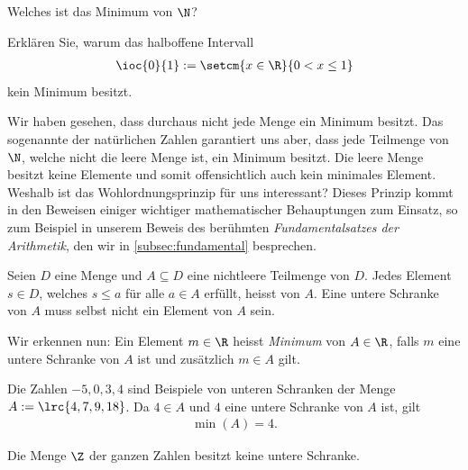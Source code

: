 \begin{myexercise}\label{myexercise:0267}
	\begin{aenum}
		\item Welches ist das Minimum von $\N$?
		\item Erklären Sie, warum das halboffene Intervall
		\begin{align*}
			\ioc{0}{1} := \setcm{x\in\R}{0<x\leq 1}
		\end{align*}
		kein Minimum besitzt.
	\end{aenum}
\end{myexercise}
\noindent
Wir haben gesehen, dass durchaus nicht jede Menge ein Minimum besitzt. Das sogenannte  der natürlichen Zahlen garantiert uns aber, dass jede Teilmenge von $\N$, welche nicht die leere Menge ist, ein Minimum besitzt. Die leere Menge besitzt keine Elemente und somit offensichtlich auch kein minimales Element. Weshalb ist das Wohlordnungsprinzip für uns interessant? Dieses Prinzip kommt in den Beweisen einiger wichtiger mathematischer Behauptungen zum Einsatz, so zum Beispiel in unserem Beweis des berühmten \textit{Fundamentalsatzes der Arithmetik}, den wir in \cref{subsec:fundamental} besprechen.

\begin{mydefinition}\label{mydefinition:schranke}
Seien $D$ eine Menge und $A\subseteq D$ eine nichtleere Teilmenge von $D$. Jedes Element $s\in D$, welches $s \leq a$ für alle $a\in A$ erfüllt, heisst  von $A$. Eine untere Schranke von $A$ muss selbst nicht ein Element von $A$ sein.
\end{mydefinition}
\noindent
Wir erkennen nun: Ein Element $m\in\R$ heisst \textit{Minimum} von $A\in\R$, falls $m$ eine untere Schranke von $A$ ist und zusätzlich $m\in A$ gilt.

\begin{myexample}
\begin{aenum}
	\item Die Zahlen $-5, 0, 3, 4$ sind Beispiele von unteren Schranken der Menge $A:=\lrc{4,7,9,18}$.
	Da $4\in A$ und $4$ eine untere Schranke von $A$ ist, gilt
	\begin{align*}
		\min(A) = 4.
	\end{align*}
	\item Die Menge $\Z$ der ganzen Zahlen besitzt keine untere Schranke.
\end{aenum}
\end{myexample}


